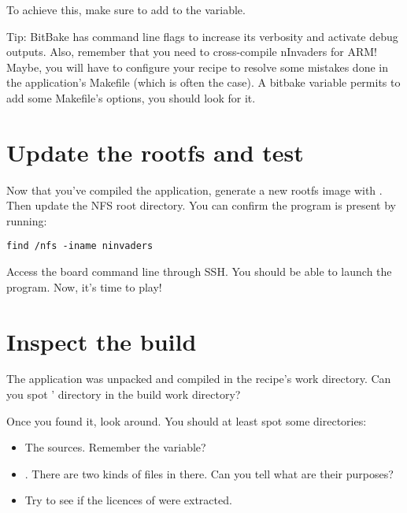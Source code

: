To achieve this, make sure to add  to the 
variable.

Tip: BitBake has command line flags to increase its verbosity and activate debug
outputs. Also, remember that you need to cross-compile nInvaders for ARM! Maybe,
you will have to configure your recipe to resolve some mistakes done in the
application's Makefile (which is often the case). A bitbake variable permits
to add some Makefile's options, you should look for it.

\section{Update the rootfs and test}

Now that you've compiled the  application, generate a new
rootfs image with . Then update the
NFS root directory. You can confirm the  program is
present by running:
\begin{verbatim}
find /nfs -iname ninvaders
\end{verbatim}

Access the board command line through SSH. You should be able to
launch the  program. Now, it's time to play!

\section{Inspect the build}

The  application was unpacked and compiled in the
recipe's work directory. Can you spot ' directory in
the build work directory?

Once you found it, look around. You should at least spot some
directories:
\begin{itemize}
    \item The sources. Remember the  variable?
    \item {}. There are two kinds of files in there. Can you
      tell what are their purposes?
    \item Try to see if the licences of  were
      extracted.
\end{itemize}
